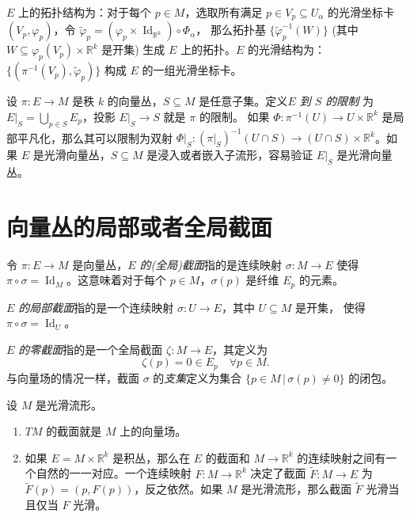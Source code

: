 \documentclass[fontset=none]{Notes}
\DeclareMathOperator\Id{Id}
\begin{document}
\begin{remark}
  $E$ 上的拓扑结构为：对于每个 $p\in M$，选取所有满足 $p\in V_p\subseteq U_\alpha$
  的光滑坐标卡 $(V_p,\varphi_p)$，令 $\tilde\varphi_p=(\varphi_p\times \Id_{\mathbb{R}^k})\circ\varPhi_\alpha$，
  那么拓扑基 $\{\tilde\varphi_p^{-1}(W)\}$ (其中 $W\subseteq \varphi_p(V_p)\times \mathbb{R}^k$ 是开集)
  生成 $E$ 上的拓扑。$E$ 的光滑结构为：$\{(\pi^{-1}(V_p),\tilde\varphi_p)\}$
  构成 $E$ 的一组光滑坐标卡。
\end{remark} 


\begin{example}[向量丛的限制]
  设 $\pi:E\to M$ 是秩 $k$ 的向量丛，$S\subseteq M$ 是任意子集。定义\emph{$E$ 到 $S$ 的限制}
  为 $E|_S=\bigcup_{p\in S}E_p$，投影 $E|_S\to S$ 就是 $\pi$ 的限制。
  如果 $\varPhi:\pi^{-1}(U)\to U\times \mathbb{R}^k$ 是局部平凡化，那么其可以限制为双射
  $\varPhi|_S:(\pi|_S)^{-1}(U\cap S)\to (U\cap S)\times \mathbb{R}^k$。如果 $E$
  是光滑向量丛，$S\subseteq M$ 是浸入或者嵌入子流形，容易验证 $E|_S$ 是光滑向量丛。
\end{example}

\section{向量丛的局部或者全局截面}

令 $\pi:E\to M$ 是向量丛，\emph{$E$ 的(全局)截面}指的是连续映射 $\sigma:M\to E$ 使得
$\pi\circ\sigma=\Id_M$。这意味着对于每个 $p\in M$，$\sigma(p)$ 是纤维 $E_p$ 的元素。

\emph{$E$ 的局部截面}指的是一个连续映射 $\sigma:U\to E$，其中 $U\subseteq M$ 是开集，
使得 $\pi\circ\sigma=\Id_U$。

\emph{$E$ 的零截面}指的是一个全局截面 $\zeta:M\to E$，其定义为
\[
  \zeta(p)=0\in E_p\quad \forall p\in M.
\]
与向量场的情况一样，截面 $\sigma$ 的\emph{支集}定义为集合 $\{p\in M\,|\, \sigma(p)\neq 0\}$ 的闭包。

\begin{example}[向量丛的截面]
  设 $M$ 是光滑流形。
  \begin{enumerate}
    \item $TM$ 的截面就是 $M$ 上的向量场。
    \item 如果 $E=M\times \mathbb{R}^k$ 是积丛，那么在 $E$ 的截面和
    $M\to \mathbb{R}^k$ 的连续映射之间有一个自然的一一对应。一个连续映射 $F:M\to \mathbb{R}^k$
    决定了截面 $\tilde F:M\to E$ 为 $\tilde F(p)=(p,F(p))$，反之依然。如果 $M$
    是光滑流形，那么截面 $\tilde F$ 光滑当且仅当 $F$ 光滑。
  \end{enumerate}
\end{example}
\end{document}
